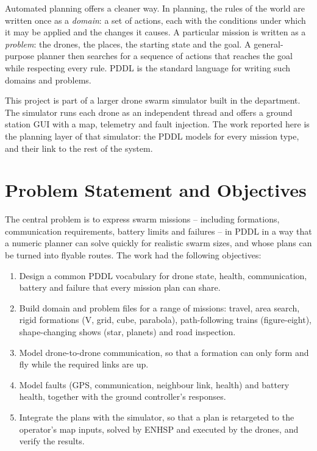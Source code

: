 \documentclass[11pt,a4paper,oneside]{report}
\begin{document}
Automated planning offers a cleaner way. In planning, the rules of the world are written once as
a \emph{domain}: a set of actions, each with the conditions under which it may be applied and the
changes it causes. A particular mission is written as a \emph{problem}: the drones, the places,
the starting state and the goal. A general-purpose planner then searches for a sequence of
actions that reaches the goal while respecting every rule. PDDL is the standard language for
writing such domains and problems.

This project is part of a larger drone swarm simulator built in the department. The simulator
runs each drone as an independent thread and offers a ground station GUI with a map, telemetry and fault injection. The work
reported here is the planning layer of that simulator: the PDDL models for every mission type,
and their link to the rest of the system.

\section{Problem Statement and Objectives}
The central problem is to express swarm missions -- including formations, communication
requirements, battery limits and failures -- in PDDL in a way that a numeric planner can solve
quickly for realistic swarm sizes, and whose plans can be turned into flyable routes. The work
had the following objectives:
\begin{enumerate}
  \item Design a common PDDL vocabulary for drone state, health, communication, battery and
        failure that every mission plan can share.
  \item Build domain and problem files for a range of missions: travel, area search, rigid
        formations (V, grid, cube, parabola), path-following trains (figure-eight), shape-changing
        shows (star, planets) and road inspection.
  \item Model drone-to-drone communication, so that a formation can only form and fly while the
        required links are up.
  \item Model faults (GPS, communication, neighbour link, health) and battery health, together
        with the ground controller's responses.
  \item Integrate the plans with the simulator, so that a plan is retargeted to the operator's map
        inputs, solved by ENHSP and executed by the drones, and verify the results.
\end{enumerate}
\end{document}
